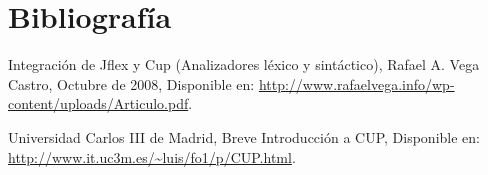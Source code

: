 \documentclass[a4paper,openright,12pt]{article}
\begin{document}
\newpage
\section{Bibliografía}

\begin{thebibliography}{20}


Integración de Jflex y Cup (Analizadores léxico y sintáctico), Rafael A. Vega Castro, Octubre de 2008, Disponible en: \url{http://www.rafaelvega.info/wp-content/uploads/Articulo.pdf}.

Universidad Carlos III de Madrid, Breve Introducción a CUP, Disponible en: \url{http://www.it.uc3m.es/~luis/fo1/p/CUP.html}.


\end{thebibliography}
\end{document}
